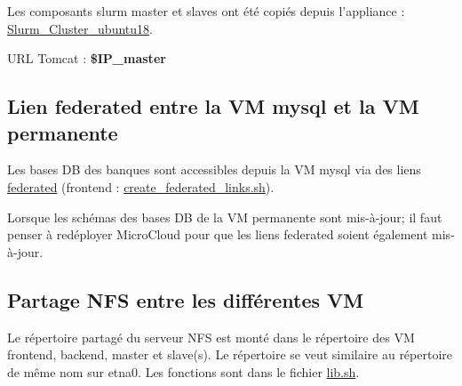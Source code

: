 Les composants slurm master et slaves ont été copiés depuis l'appliance :  \href{https://nuv.la/module/ifb/devzone/jlorenzo/cluster/Slurm_Cluster_ubuntu18}{Slurm\_Cluster\_ubuntu18}.

URL Tomcat : \textbf{\$IP\_master}

\subsection{Lien federated entre la VM mysql et  la VM permanente}
Les bases DB des banques sont accessibles depuis la VM mysql via des liens \href{https://dev.mysql.com/doc/refman/8.0/en/federated-storage-engine.html}{federated} (frontend : \href{https://github.com/IFB-ElixirFr/biosphere-microcloud/blob/master/frontend/create_federated_links.sh}{create\_federated\_links.sh}).\\

\begin{mycolorbox}
	Lorsque les schémas des bases DB de la VM permanente sont mis-à-jour; il faut penser à redéployer MicroCloud pour que les liens federated soient également mis-à-jour.
\end{mycolorbox}

\subsection{Partage NFS entre les différentes VM}
Le répertoire partagé  du serveur NFS est monté dans le répertoire 
des VM frontend, backend, master et slave(s).
Le répertoire  se veut similaire au répertoire de même nom sur etna0. 
Les fonctions sont dans le fichier \href{https://github.com/IFB-ElixirFr/biosphere-microcloud/blob/master/lib.sh}{lib.sh}.
